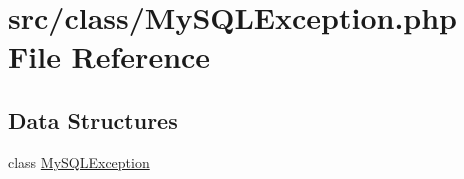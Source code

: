 \hypertarget{_my_s_q_l_exception_8php}{}\section{src/class/\+My\+S\+Q\+L\+Exception.php File Reference}
\label{_my_s_q_l_exception_8php}
\subsection*{Data Structures}
\begin{DoxyCompactItemize}
\item 
class \hyperlink{class_my_s_q_l_exception}{My\+S\+Q\+L\+Exception}
\end{DoxyCompactItemize}

